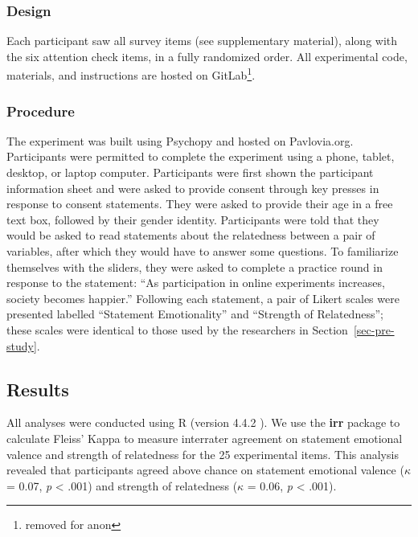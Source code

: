 \documentclass[manuscript,screen,review,anonymous]{acmart}
\begin{document}
\subsubsection{Design}\label{sec-design-pre}

Each participant saw all survey items (see supplementary material),
along with the six attention check items, in a fully randomized order.
All experimental code, materials, and instructions are hosted on
GitLab\footnote{removed for anon}.

\subsubsection{Procedure}\label{sec-procedure-pre}

The experiment was built using Psychopy \citep{pierce_2019} and hosted
on Pavlovia.org. Participants were permitted to complete the experiment
using a phone, tablet, desktop, or laptop computer. Participants were
first shown the participant information sheet and were asked to provide
consent through key presses in response to consent statements. They were
asked to provide their age in a free text box, followed by their gender
identity. Participants were told that they would be asked to read
statements about the relatedness between a pair of variables, after
which they would have to answer some questions. To familiarize
themselves with the sliders, they were asked to complete a practice
round in response to the statement: ``As participation in online
experiments increases, society becomes happier.'' Following each
statement, a pair of Likert scales were presented labelled ``Statement
Emotionality'' and ``Strength of Relatedness''; these scales were
identical to those used by the researchers in
Section~\ref{sec-pre-study}.

\subsection{Results}\label{sec-results-pre}

All analyses were conducted using R (version 4.4.2 \citep{rcore}). We
use the \textbf{irr} package to calculate Fleiss' Kappa to measure
interrater agreement on statement emotional valence and strength of
relatedness for the 25 experimental items. This analysis revealed that
participants agreed above chance on statement emotional valence
(\(\kappa\) = 0.07, \emph{p} \textless{} .001) and strength of
relatedness (\(\kappa\) = 0.06, \emph{p} \textless{} .001).
\end{document}
